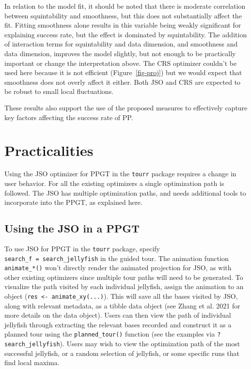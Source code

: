 \documentclass[
  12pt,
]{interact}
\theoremstyle{plain}
\begin{document}
In relation to the model fit, it should be noted that there is moderate
correlation between squintability and smoothness, but this does not
substantially affect the fit. Fitting smoothness alone results in this
variable being weakly significant for explaining success rate, but the
effect is dominated by squintability. The addition of interaction terms
for squintability and data dimension, and smoothness and data dimension,
improves the model slightly, but not enough to be practically important
or change the interpretation above. The CRS optimizer couldn't be used
here because it is not efficient (Figure~\ref{fig-proj}) but we would
expect that smoothness does not overly affect it either. Both JSO and
CRS are expected to be robust to small local fluctuations.

These results also support the use of the proposed measures to
effectively capture key factors affecting the success rate of PP.

\section{Practicalities}\label{sec-discussion}

Using the JSO optimizer for PPGT in the \texttt{tourr} package requires
a change in user behavior. For all the existing optimizers a single
optimization path is followed. The JSO has multiple optimization paths,
and needs additional tools to incorporate into the PPGT, as explained
here.

\subsection{Using the JSO in a PPGT}\label{using-the-jso-in-a-ppgt}

To use JSO for PPGT in the \texttt{tourr} package, specify
\texttt{search\_f\ =\ search\_jellyfish} in the guided tour. The
animation function \texttt{animate\_*()} won't directly render the
animated projection for JSO, as with other existing optimizers since
multiple tour paths will need to be generated. To visualize the path
visited by each individual jellyfish, assign the animation to an object
(\texttt{res\ \textless{}-\ animate\_xy(...)}). This will save all the
bases visited by JSO, along with relevant metadata, as a tibble data
object (see Zhang et al. 2021 for more details on the data object).
Users can then view the path of individual jellyfish through extracting
the relevant bases recorded and construct it as a planned tour using the
\texttt{planned\_tour()} function (see the examples via
\texttt{?search\_jellyfish}). Users may wish to view the optimization
path of the most successful jellyfish, or a random selection of
jellyfish, or some specific runs that find local maxima.
\end{document}
